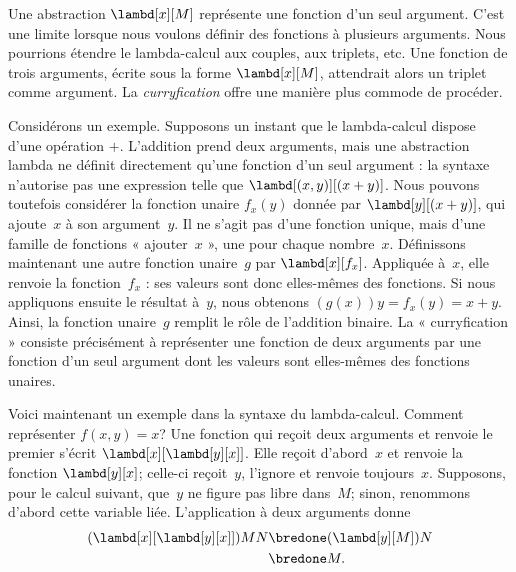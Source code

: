 \documentclass[../../../include/open-logic-section]{subfiles}
\begin{document}

Une abstraction $\lambd[x][M]$ représente
une fonction d'un seul argument. C'est une
limite lorsque nous voulons définir des
fonctions à plusieurs arguments. Nous
pourrions étendre le lambda-calcul aux
couples, aux triplets, etc. Une fonction
de trois arguments, écrite sous la forme
$\lambd[x][M]$, attendrait alors un triplet
comme argument. La \emph{curryfication} offre
une manière plus commode de procéder.

Considérons un exemple. Supposons un instant
que le lambda-calcul dispose d'une opération
$+$. L'addition prend deux arguments, mais
une abstraction lambda ne définit directement
qu'une fonction d'un seul argument : la
syntaxe n'autorise pas une expression telle
que $\lambd[(x,y)][(x+y)]$. Nous pouvons
toutefois considérer la fonction unaire
$f_x(y)$ donnée par $\lambd[y][(x+y)]$,
qui ajoute~$x$ à son argument~$y$. Il ne
s'agit pas d'une fonction unique, mais
d'une famille de fonctions « ajouter~$x$ »,
une pour chaque nombre~$x$. Définissons
maintenant une autre fonction unaire~$g$
par $\lambd[x][f_x]$. Appliquée à~$x$,
elle renvoie la fonction~$f_x$ : ses
valeurs sont donc elles-mêmes des fonctions.
Si nous appliquons ensuite le résultat à~$y$,
nous obtenons $(g(x))y=f_x(y)=x+y$. Ainsi,
la fonction unaire~$g$ remplit le rôle
de l'addition binaire. La « curryfication »
consiste précisément à représenter une
fonction de deux arguments par une fonction
d'un seul argument dont les valeurs sont
elles-mêmes des fonctions unaires.

Voici maintenant un exemple dans la syntaxe
du lambda-calcul. Comment représenter
$f(x,y)=x$? Une fonction qui reçoit deux
arguments et renvoie le premier s'écrit
$\lambd[x][\lambd[y][x]]$. Elle reçoit
d'abord~$x$ et renvoie la fonction
$\lambd[y][x]$; celle-ci reçoit~$y$,
l'ignore et renvoie toujours~$x$.
Supposons, pour le calcul suivant, que~$y$
ne figure pas libre dans~$M$; sinon,
renommons d'abord cette variable liée.
L'application à deux arguments donne
\begin{align*}
(\lambd[x][\lambd[y][x]])MN
&\bredone (\lambd[y][M])N \\
&\bredone M.
\end{align*}
\end{document}
